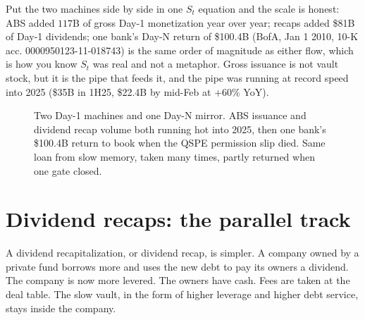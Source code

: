 Put the two machines side by side in one $S_t$ equation and the scale is honest: ABS added $117$B of gross Day-1 monetization year over year; recaps added \$81B of Day-1 dividends; one bank's Day-N return of \$100.4B (BofA, Jan 1 2010, 10-K acc. 0000950123-11-018743) is the same order of magnitude as either flow, which is how you know $S_t$ was real and not a metaphor. Gross issuance is not vault stock, but it is the pipe that feeds it, and the pipe was running at record speed into 2025 (\$35B in 1H25, \$22.4B by mid-Feb at +60\% YoY).

\begin{figure}[h]
\centering
{}
\caption{Two Day-1 machines and one Day-N mirror. ABS issuance and dividend recap volume both running hot into 2025, then one bank's \$100.4B return to book when the QSPE permission slip died. Same loan from slow memory, taken many times, partly returned when one gate closed.}
\label{fig:timeline-machines}
\end{figure}

\section{Dividend recaps: the parallel track}

A dividend recapitalization, or dividend recap, is simpler. A company owned by a private fund borrows more and uses the new debt to pay its owners a dividend. The company is now more levered. The owners have cash. Fees are taken at the deal table. The slow vault, in the form of higher leverage and higher debt service, stays inside the company.

